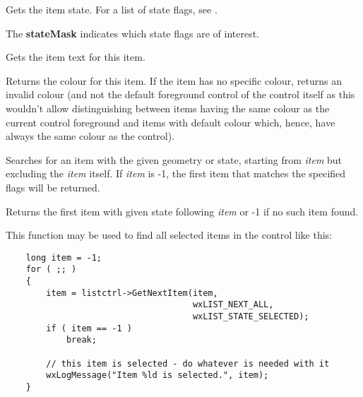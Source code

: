\label{wxlistctrlgetitemstate}


Gets the item state. For a list of state flags, see .

The {\bf stateMask} indicates which state flags are of interest.


\label{wxlistctrlgetitemtext}


Gets the item text for this item.


\label{wxlistctrlgetitemtextcolour}


Returns the colour for this item. If the item has no specific colour, returns
an invalid colour (and not the default foreground control of the control itself
as this wouldn't allow distinguishing between items having the same colour as
the current control foreground and items with default colour which, hence, have
always the same colour as the control).


\label{wxlistctrlgetnextitem}


Searches for an item with the given geometry or state, starting from
{\it item} but excluding the {\it item} itself. If {\it item} is -1,
the first item that matches the specified flags will be returned.

Returns the first item with given state following {\it item} or -1 if
no such item found.

This function may be used to find all selected items in the control like this:

\begin{verbatim}
    long item = -1;
    for ( ;; )
    {
        item = listctrl->GetNextItem(item,
                                     wxLIST_NEXT_ALL,
                                     wxLIST_STATE_SELECTED);
        if ( item == -1 )
            break;

        // this item is selected - do whatever is needed with it
        wxLogMessage("Item %ld is selected.", item);
    }
\end{verbatim}

